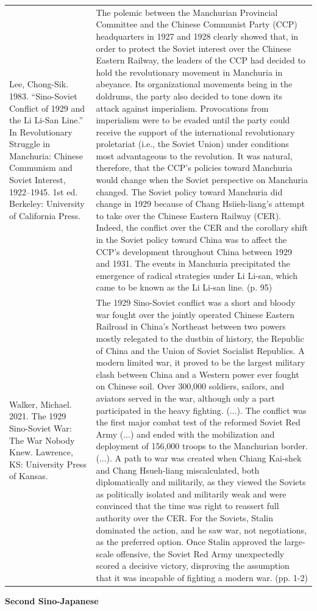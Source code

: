 {\begin{longtable}{p{}p{}}
\\
Lee, Chong-Sik. 1983. “Sino-Soviet Conflict of 1929 and the Li Li-San Line.” In Revolutionary Struggle in Manchuria: Chinese Communism and Soviet Interest, 1922–1945. 1st ed. Berkeley: University of California Press. & The polemic between the Manchurian Provincial Committee and the Chinese Communist Party (CCP) headquarters in 1927 and 1928 clearly showed that, in order to protect the Soviet interest over the Chinese Eastern Railway, the leaders of the CCP had decided to hold the revolutionary movement in Manchuria in abeyance. Its organizational movements being in the doldrums, the party also decided to tone down its attack against imperialism. Provocations from imperialism were to be evaded until the party could receive the support of the international revolutionary proletariat (i.e., the Soviet Union) under conditions most advantageous to the revolution. It was natural, therefore, that the CCP's policies toward Manchuria would change when the Soviet perspective on Manchuria changed. The Soviet policy toward Manchuria did change in 1929 because of Chang Hsiieh-liang's attempt to take over the Chinese Eastern Railway (CER). Indeed, the conflict over the CER and the corollary shift in the Soviet policy toward China was to affect the CCP's development throughout China between 1929 and 1931. The events in Manchuria precipitated the emergence of radical strategies under Li Li-san, which came to be known as the Li Li-san line. (p. 95)
\\
Walker, Michael. 2021. The 1929 Sino-Soviet War: The War Nobody Knew. Lawrence, KS: University Press of Kansas. & The 1929 Sino-Soviet conflict was a short and bloody war fought over the jointly operated Chinese Eastern Railroad in China's Northeast between two powers mostly relegated to the dustbin of history, the Republic of China and the Union of Soviet Socialist Republics. A modern limited war, it proved to be the largest military clash between China and a Western power ever fought on Chinese soil. Over 300,000 soldiers, sailors, and aviators served in the war, although only a part participated in the heavy fighting. (...). The conflict was the first major combat test of the reformed Soviet Red Army (...) and ended with the mobilization and deployment of 156,000 troops to the Manchurian border. (...). A path to war was created when Chiang Kai-shek and Chang Hsueh-liang miscalculated, both diplomatically and militarily, as they viewed the Soviets as politically isolated and militarily weak and were convinced that the time was right to reassert full authority over the CER. For the Soviets, Stalin dominated the action, and he saw war, not negotiations, as the preferred option. Once Stalin approved the large-scale offensive, the Soviet Red Army unexpectedly scored a decisive victory, disproving the assumption that it was incapable of fighting a modern war. (pp. 1-2)
\\
\end{longtable}}
\clearpage
         \textbf{Second Sino-Japanese} 

